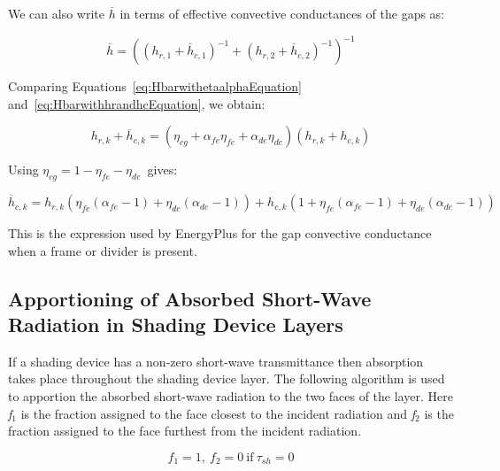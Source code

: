 We can also write \(\overline h\) in terms of effective convective conductances of the gaps as:

\begin{equation}
\overline h  = {\left( {{{\left( {{h_{r,1}} + {{\overline h }_{c,1}}} \right)}^{ - 1}} + {{\left( {{h_{r,2}} + {{\overline h }_{c,2}}} \right)}^{ - 1}}} \right)^{ - 1}}
\label{eq:HbarwithhrandhcEquation}
\end{equation}

Comparing Equations~\ref{eq:HbarwithetaalphaEquation} and~\ref{eq:HbarwithhrandhcEquation}, we obtain:

\begin{equation}
{h_{r,k}} + {\overline h_{c,k}} = \left( {{\eta_{cg}} + {\alpha_{fe}}{\eta_{fe}} + {\alpha_{de}}{\eta_{de}}} \right)\left( {{h_{r,k}} + {h_{c,k}}} \right)
\end{equation}

Using \({\eta_{cg}} = 1 - {\eta_{fe}} - {\eta_{de}}\)~gives:

\begin{equation}
{\overline h_{c,k}} = {h_{r,k}}\left( {{\eta_{fe}}\left( {{\alpha_{fe}} - 1} \right) + {\eta_{de}}\left( {{\alpha_{de}} - 1} \right)} \right) + {h_{c,k}}\left( {1 + {\eta_{fe}}\left( {{\alpha_{fe}} - 1} \right) + {\eta_{de}}\left( {{\alpha_{de}} - 1} \right)} \right)
\end{equation}

This is the expression used by EnergyPlus for the gap convective conductance when a frame or divider is present.

\subsection{Apportioning of Absorbed Short-Wave Radiation in Shading Device Layers}\label{apportioning-of-absorbed-short-wave-radiation-in-shading-device-layers}

If a shading device has a non-zero short-wave transmittance then absorption takes place throughout the shading device layer. The following algorithm is used to apportion the absorbed short-wave radiation to the two faces of the layer. Here \emph{f\(_{1}\)} is the fraction assigned to the face closest to the incident radiation and \emph{f\(_{2}\)} is the fraction assigned to the face furthest from the incident radiation.

\begin{equation}
{f_1} = 1,~{\mathrm{ }}{f_2} = 0{\mathrm{~if~}}{\tau_{sh}} = 0
\end{equation}

